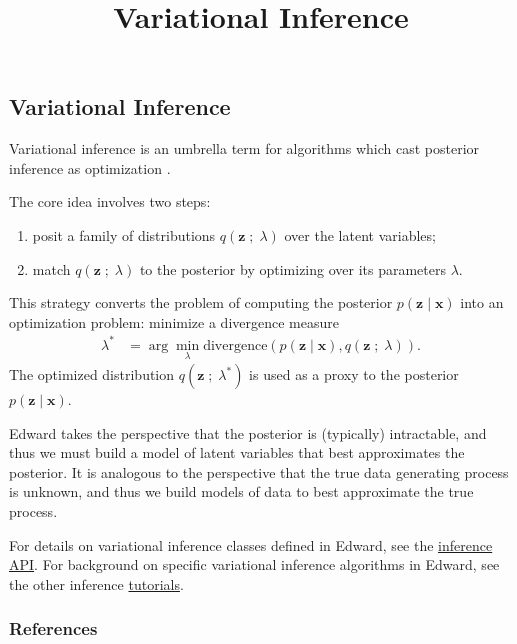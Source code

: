 \title{Variational Inference}

\subsection{Variational Inference}

Variational inference is an umbrella term for algorithms which cast
posterior inference as optimization
\citep{hinton1993keeping,waterhouse1996bayesian,jordan1999introduction}.

The core idea involves two steps:
\begin{enumerate}
   \item posit a family of distributions $q(\mathbf{z}\;;\;\lambda)$
   over the latent variables;
   \item match $q(\mathbf{z}\;;\;\lambda)$ to the posterior by
   optimizing over its parameters $\lambda$.
 \end{enumerate}
This strategy converts the problem of computing the posterior
$p(\mathbf{z} \mid \mathbf{x})$ into an optimization problem:
minimize a divergence measure
\begin{align*}
  \lambda^*
  &=
  \arg\min_\lambda \text{divergence}(
  p(\mathbf{z} \mid \mathbf{x})
  ,
  q(\mathbf{z}\;;\;\lambda)
  ).
\end{align*}
The optimized distribution $q(\mathbf{z}\;;\;\lambda^*)$ is used as
a proxy to the posterior $p(\mathbf{z}\mid \mathbf{x})$.

Edward takes the perspective that the posterior is (typically)
intractable, and thus we must build a model of latent variables that
best approximates the posterior.
It is analogous to the perspective
that the true data generating process is unknown, and thus we build
models of data to best approximate the true process.

For details on variational inference classes defined in Edward,
see the \href{/api/inference}{inference API}.
For background on specific variational inference algorithms in
Edward, see the other inference \href{/tutorials/}{tutorials}.

\subsubsection{References}\label{references}

